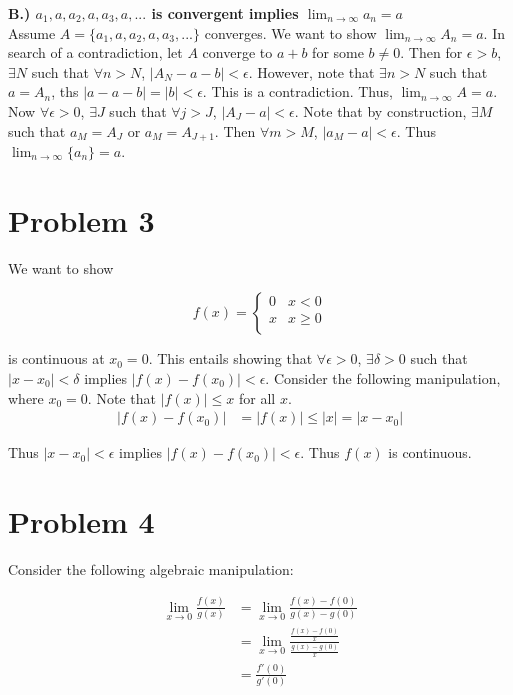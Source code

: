 \documentclass[10pt]{article} %
\begin{document}
\textbf{B.) $a_1, a, a_2, a, a_3, a,...$ is convergent implies $\lim_{n\rightarrow\infty}a_n = a$}\\
Assume $A = \{a_1, a, a_2, a, a_3, ...\}$ converges. We want to show $\lim_{n\rightarrow\infty}A_n = a$. In search of a contradiction, let $A$ converge to $a + b$ for some $b \neq 0$. Then for $\epsilon > b$, $\exists N$ such that $\forall n > N$, $|A_N-a-b|<\epsilon$. However, note that $\exists n > N$ such that $a = A_n$, ths $|a - a - b| = |b| < \epsilon$. This is a contradiction. Thus, $\lim_{n\rightarrow\infty} A = a$.\\

Now $\forall \epsilon>0$, $\exists J$ such that $\forall j > J$, $|A_J - a|<\epsilon$. Note that by construction, $\exists M$ such that $a_M = A_J$ or $a_M = A_{J+1}$. Then $\forall m > M$, $|a_M - a|<\epsilon$. Thus $\lim_{n\rightarrow\infty}\{a_n\} = a$.\\

\section{Problem 3}
We want to show

\[
f(x) =
\begin{cases}
  0 & x <    0 \\
  x & x \geq 0 \\
\end{cases}
\]

is continuous at $x_0 = 0$. This entails showing that $\forall \epsilon>0$, $\exists \delta>0$ such that $|x-x_0|<\delta$ implies $|f(x)-f(x_0)|<\epsilon$. Consider the following manipulation, where $x_0 = 0$. Note that $|f(x)|\leq x$ for all $x$.\\

\begin{align*}
  |f(x) - f(x_0)| &= |f(x)| \leq |x| = |x-x_0|
\end{align*}

Thus $|x-x_0|<\epsilon$ implies $|f(x)-f(x_0)|<\epsilon$. Thus $f(x)$ is continuous.\\

\section{Problem 4}
Consider the following algebraic manipulation:

\begin{align*}
  \lim_{x\rightarrow0}\frac{f(x)}{g(x)} &= \lim_{x\rightarrow0}\frac{f(x)-f(0)}{g(x)-g(0)}\\
  &= \lim_{x\rightarrow0}\frac{\frac{f(x)-f(0)}{x}}{\frac{g(x)-g(0)}{x}}\\
  &= \frac{f'(0)}{g'(0)}\\
\end{align*}
\end{document}
